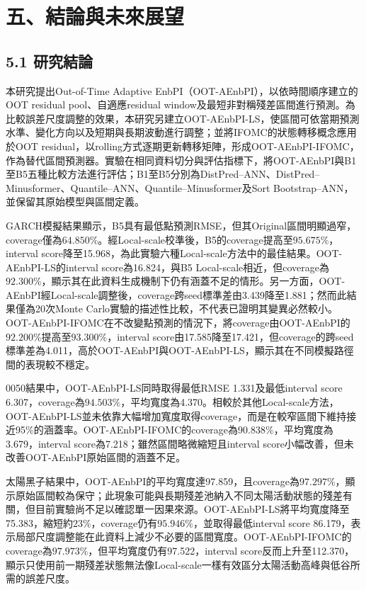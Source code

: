 \chapter*{五、結論與未來展望}

\section*{5.1 研究結論}

本研究提出Out-of-Time Adaptive EnbPI（OOT-AEnbPI），以依時間順序建立的OOT residual pool、自適應residual window及最短非對稱殘差區間進行預測。為比較誤差尺度調整的效果，本研究另建立OOT-AEnbPI-LS，使區間可依當期預測水準、變化方向以及短期與長期波動進行調整；並將IFOMC的狀態轉移概念應用於OOT residual，以rolling方式逐期更新轉移矩陣，形成OOT-AEnbPI-IFOMC，作為替代區間預測器。實驗在相同資料切分與評估指標下，將OOT-AEnbPI與B1至B5五種比較方法進行評估；B1至B5分別為DistPred--ANN、DistPred--Minusformer、Quantile--ANN、Quantile--Minusformer及Sort Bootstrap--ANN，並保留其原始模型與區間定義。

GARCH模擬結果顯示，B5具有最低點預測RMSE，但其Original區間明顯過窄，coverage僅為$64.850\%$。經Local-scale校準後，B5的coverage提高至$95.675\%$，interval score降至15.968，為此實驗六種Local-scale方法中的最佳結果。OOT-AEnbPI-LS的interval score為16.824，與B5 Local-scale相近，但coverage為$92.300\%$，顯示其在此資料生成機制下仍有涵蓋不足的情形。另一方面，OOT-AEnbPI經Local-scale調整後，coverage跨seed標準差由3.439降至1.881；然而此結果僅為20次Monte Carlo實驗的描述性比較，不代表已證明其變異必然較小。OOT-AEnbPI-IFOMC在不改變點預測的情況下，將coverage由OOT-AEnbPI的$92.200\%$提高至$93.300\%$，interval score由17.585降至17.421，但coverage的跨seed標準差為4.011，高於OOT-AEnbPI與OOT-AEnbPI-LS，顯示其在不同模擬路徑間的表現較不穩定。

0050結果中，OOT-AEnbPI-LS同時取得最低RMSE 1.331及最低interval score 6.307，coverage為$94.503\%$，平均寬度為4.370。相較於其他Local-scale方法，OOT-AEnbPI-LS並未依靠大幅增加寬度取得coverage，而是在較窄區間下維持接近95\%的涵蓋率。OOT-AEnbPI-IFOMC的coverage為$90.838\%$，平均寬度為3.679，interval score為7.218；雖然區間略微縮短且interval score小幅改善，但未改善OOT-AEnbPI原始區間的涵蓋不足。

太陽黑子結果中，OOT-AEnbPI的平均寬度達97.859，且coverage為$97.297\%$，顯示原始區間較為保守；此現象可能與長期殘差池納入不同太陽活動狀態的殘差有關，但目前實驗尚不足以確認單一因果來源。OOT-AEnbPI-LS將平均寬度降至75.383，縮短約$23\%$，coverage仍有$95.946\%$，並取得最低interval score 86.179，表示局部尺度調整能在此資料上減少不必要的區間寬度。OOT-AEnbPI-IFOMC的coverage為$97.973\%$，但平均寬度仍有97.522，interval score反而上升至112.370，顯示只使用前一期殘差狀態無法像Local-scale一樣有效區分太陽活動高峰與低谷所需的誤差尺度。

